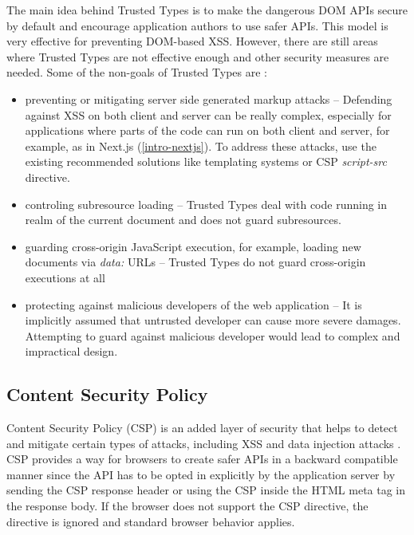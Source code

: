 The main idea behind Trusted Types is to make the dangerous DOM APIs secure by default and encourage
application authors to use safer APIs. This model is very effective for preventing DOM-based XSS.
However, there are still areas where Trusted Types are not effective enough and other security
measures are needed. Some of the non-goals of Trusted Types are \cite{tt_spec:non_goals}:

\begin{itemize}
  \item preventing or mitigating server side generated markup attacks -- Defending against XSS on
        both client and server can be really complex, especially for applications where parts of the
        code can run on both client and server, for example, as in Next.js (\ref{intro-nextjs}). To
        address these attacks, use the existing recommended solutions like templating systems or CSP
        \emph{script-src} directive.
  \item controling subresource loading -- Trusted Types deal with code running in realm of the
        current document and does not guard subresources.
  \item guarding cross-origin JavaScript execution, for example, loading new documents via
        \emph{data:} URLs -- Trusted Types do not guard cross-origin executions at all
  \item protecting against malicious developers of the web application -- It is implicitly assumed
        that untrusted developer can cause more severe damages. Attempting to guard against
        malicious developer would lead to complex and impractical design.
\end{itemize}

\subsection{Content Security Policy}
\label{csp}

Content Security Policy (CSP) is an added layer of security that helps to detect and mitigate
certain types of attacks, including XSS and data injection attacks \cite{mdn_csp_def}. CSP provides
a way for browsers to create safer APIs in a backward compatible manner since the API has to be
opted in explicitly by the application server by sending the CSP response header or using the CSP
inside the HTML meta tag in the response body. If the browser does not support the CSP directive,
the directive is ignored and standard browser behavior applies.

